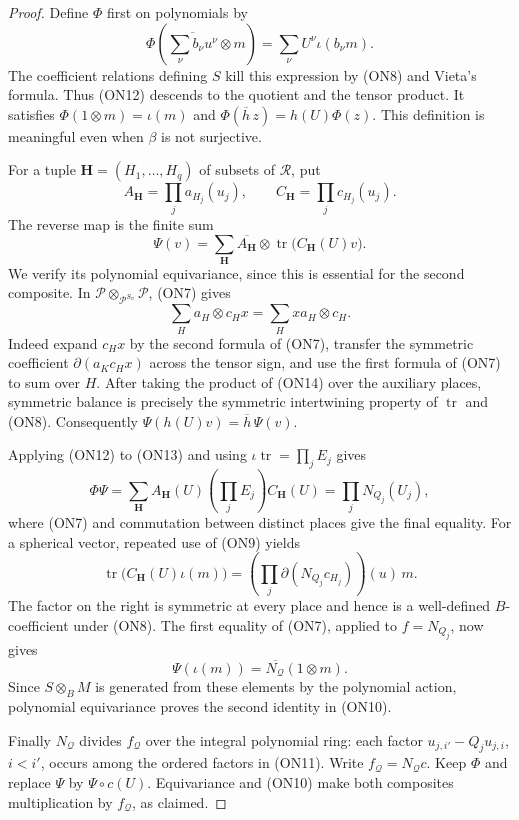 \begin{proof}
Define \(\Phi\) first on polynomials by
\[
 \Phi\!\left(\overline{\sum_\nu b_\nu u^\nu}\otimes m\right)
       =\sum_\nu U^\nu\iota(b_\nu m).
 \tag{ON12}
\]
The coefficient relations defining \(S\) kill this expression by
(ON8) and Vieta's formula.  Thus (ON12) descends to the quotient
and the tensor product.  It satisfies
\(\Phi(1\otimes m)=\iota(m)\) and
\(\Phi(\overline h\,z)=h(U)\Phi(z)\).
This definition is meaningful even when \(\beta\) is not surjective.

For a tuple \(\mathbf H=(H_1,\ldots,H_q)\) of subsets of
\(\mathcal R\), put
\[
 A_{\mathbf H}=\prod_j a_{H_j}(u_j),\qquad
 C_{\mathbf H}=\prod_j c_{H_j}(u_j).
\]
The reverse map is the finite sum
\[
 \Psi(v)=
 \sum_{\mathbf H}
    \overline{A_{\mathbf H}}\otimes
       \operatorname{tr}\bigl(C_{\mathbf H}(U)v\bigr).
 \tag{ON13}
\]
We verify its polynomial equivariance, since this is essential for
the second composite.  In
\(\mathcal P\otimes_{\mathcal P^{S_n}}\mathcal P\), (ON7) gives
\[
 \sum_Ha_H\otimes c_Hx=\sum_Hxa_H\otimes c_H .
 \tag{ON14}
\]
Indeed expand \(c_Hx\) by the second formula of (ON7), transfer
the symmetric coefficient
\(\partial(a_Kc_Hx)\) across the tensor sign, and use the first
formula of (ON7) to sum over \(H\).
After taking the product of (ON14) over the auxiliary places,
symmetric balance is precisely the symmetric intertwining property
of \(\operatorname{tr}\) and (ON8).
Consequently
\(\Psi(h(U)v)=\overline h\,\Psi(v)\).

Applying (ON12) to (ON13) and using
\(\iota\operatorname{tr}=\prod_jE_j\) gives
\[
 \Phi\Psi
 =\sum_{\mathbf H}A_{\mathbf H}(U)
            \left(\prod_jE_j\right)C_{\mathbf H}(U)
 =\prod_jN_{Q_j}(U_j),
\]
where (ON7) and commutation between distinct places give the final
equality.
For a spherical vector, repeated use of (ON9) yields
\[
 \operatorname{tr}\bigl(C_{\mathbf H}(U)\iota(m)\bigr)
  =\left(\prod_j
        \partial(N_{Q_j}c_{H_j})\right)(u)\,m.
\]
The factor on the right is symmetric at every place and hence is a
well-defined \(B\)-coefficient under (ON8).
The first equality of (ON7), applied to \(f=N_{Q_j}\), now gives
\[
 \Psi(\iota(m))=\overline{N_{\mathcal Q}}(1\otimes m).
\]
Since \(S\otimes_BM\) is generated from these elements by the
polynomial action, polynomial equivariance proves the second
identity in (ON10).

Finally \(N_{\mathcal Q}\) divides \(f_{\mathcal Q}\) over the integral
polynomial ring: each factor \(u_{j,i'}-Q_ju_{j,i}\), \(i<i'\),
occurs among the ordered factors in (ON11).
Write \(f_{\mathcal Q}=N_{\mathcal Q}c\).
Keep \(\Phi\) and replace \(\Psi\) by \(\Psi\circ c(U)\).
Equivariance and (ON10) make both composites multiplication by
\(f_{\mathcal Q}\), as claimed.
\end{proof}

